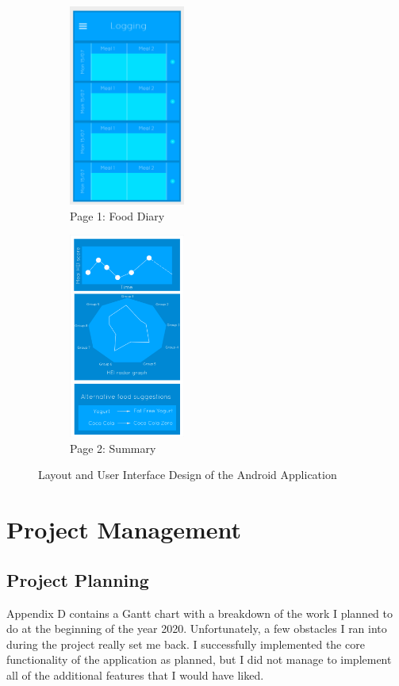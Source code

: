 \documentclass{article}
\begin{document}
\begin{figure}[h]
\centering
\begin{subfigure}{.5\textwidth}
  \centering
  \includegraphics[width=3.8cm]{page1.jpg}
  \caption{Page 1: Food Diary}
  \label{fig:food_diary}
\end{subfigure}%
\begin{subfigure}{.5\textwidth}
  \centering
  \includegraphics[width=3.8cm]{page_2_updated.png}
  \caption{Page 2: Summary}
  \label{fig:summary}
\end{subfigure}
\caption{Layout and User Interface Design of the Android Application}
\label{fig:reference_design}
\end{figure}

\section{Project Management}
\subsection{Project Planning}
Appendix D contains a Gantt chart with a breakdown of the work I planned to do at the beginning of the year 2020. Unfortunately, a few obstacles I ran into during the project really set me back. I successfully implemented the core functionality of the application as planned, but I did not manage to implement all of the additional features that I would have liked. 
\end{document}
